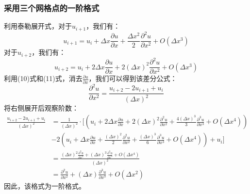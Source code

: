 \documentclass[UTF8]{ctexart}
\begin{document}
\subsubsection{采用三个网格点的一阶格式}
利用泰勒展开式，对于$u_{i+1}$，我们有：
\begin{equation}
    u_{i+1} = u_i + \Delta x \frac{\partial u}{\partial x} + \frac{\Delta x^2}{2} \frac{\partial^2 u}{\partial x^2} + O(\Delta x^3)
\end{equation}
对于$u_{i+2}$，我们有：
\begin{equation}
    u_{i+2} = u_i + 2\Delta x \frac{\partial u}{\partial x} + 2(\Delta x)^2 \frac{\partial^2 u}{\partial x^2} + O(\Delta x^3)
\end{equation}
利用(10)式和(11)式，消去$\frac{\partial u}{\partial x}$，我们可以得到该差分公式：
\begin{equation}
    \frac{\partial^2 u}{\partial x^2} = \frac{u_{i+2} - 2u_{i+1} + u_i}{(\Delta x)^2}
\end{equation}
将右侧展开后观察阶数：
\begin{equation}
    \begin{aligned}
        \frac{u_{i+2} - 2u_{i+1} + u_i}{(\Delta x)^2} &= \frac{1}{(\Delta x)^2}\cdot [(u_i + 2\Delta x \frac{\partial u}{\partial x} + 2(\Delta x)^2 \frac{\partial^2 u}{\partial x^2} + \frac{4(\Delta x)^3}{3} \frac{\partial^3 u}{\partial x^3} + O(\Delta x^4)) \\
        &- 2(u_i + \Delta x \frac{\partial u}{\partial x} + \frac{(\Delta x)^2}{2} \frac{\partial^2 u}{\partial x^2} + \frac{(\Delta x)^3}{6} \frac{\partial^3 u}{\partial x^3} + O(\Delta x^4)) + u_i] \\
        &= \frac{(\Delta x)^2\frac{\partial^2 u}{\partial x^2} + (\Delta x)^3 \frac{\partial^3 u}{\partial x^3} + O(\Delta x^4)}{(\Delta x)^2} \\
        &= \frac{\partial^2 u}{\partial x^2} + (\Delta x) \frac{\partial^3 u}{\partial x^3} + O(\Delta x^2)
    \end{aligned}
\end{equation}
因此，该格式为一阶格式。
\end{document}

